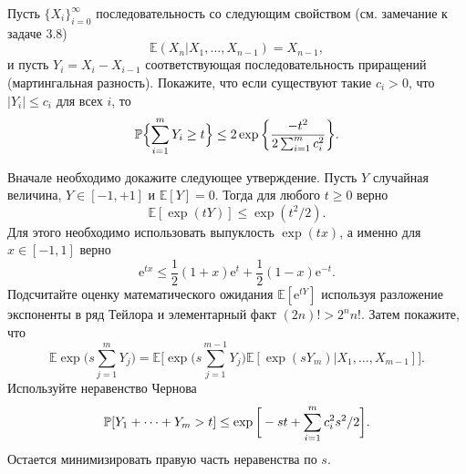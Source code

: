 \begin{problem}
Пусть $\{X_i\}_{i=0}^{\infty}$ последовательность со следующим свойством (см. замечание к задаче 3.8)
\begin{equation*}
\mathbb{E}(X_n|X_1,\dots,X_{n-1}) =X_{n-1},
\end{equation*}
и пусть $Y_i = X_i-X_{i-1}$ соответствующая последовательность приращений (мартингальная разность). Покажите, что если существуют такие $c_i>0$, что $|Y_i|\leq c_i$ для всех $i$, то
\begin{equation*}
\mathrm{{\mathbb P}}\Bigl\{\sum_{i=1}^{m}Y_i \geq t\Bigr\}\leq 2\exp\bigg\{\frac{-t^2}{2\sum_{i=1}^{m}c^2_i}\biggl\}.
\end{equation*}
\end{problem}
\begin{ordre}


Вначале необходимо докажите следующее утверждение.
 Пусть $Y$ случайная величина,  $Y\in [-1,+1]$ и $\mathbb{E}[Y]=0$. Тогда для любого $t\geq 0$ верно 
\begin{equation*}
\mathbb{E}[\exp(tY)]\leq \exp(t^2/2).
\end{equation*}
Для этого необходимо использовать выпуклость $\exp(tx)$, а именно для $x\in[-1,1]$ верно
\begin{equation*}
\text{e}^{tx}\leq \frac{1}{2}(1+x)\text{e}^{t} +\frac{1}{2}(1-x)\text{e}^{-t}.
\end{equation*}
Подсчитайте оценку математического ожидания $\mathbb{E}[\text{e}^{tY}]$ используя разложение экспоненты в ряд Тейлора и элементарный факт $(2n)!>2^nn!$. Затем покажите, что 
\begin{equation*}
\mathbb{E}\exp\biggl(s\sum_{j=1}^m Y_j\biggr) = \mathbb{E}\biggl[\exp\biggl(s \sum_{j=1}^{m-1} Y_j\biggr)\mathbb{E}[\exp(sY_m)|X_{1},\dots,X_{m-1}]\biggl]. 
\end{equation*}
Используйте неравенство Чернова
\begin{equation*}
\mathrm{{\mathbb P}}[Y_1+\dots+Y_m>t]\leq \exp\bigg[-st+\sum_{i=1}^mc^2_i s^2/2\biggr].
\end{equation*}
Остается минимизировать правую часть неравенства по $s$.

\end{ordre}


